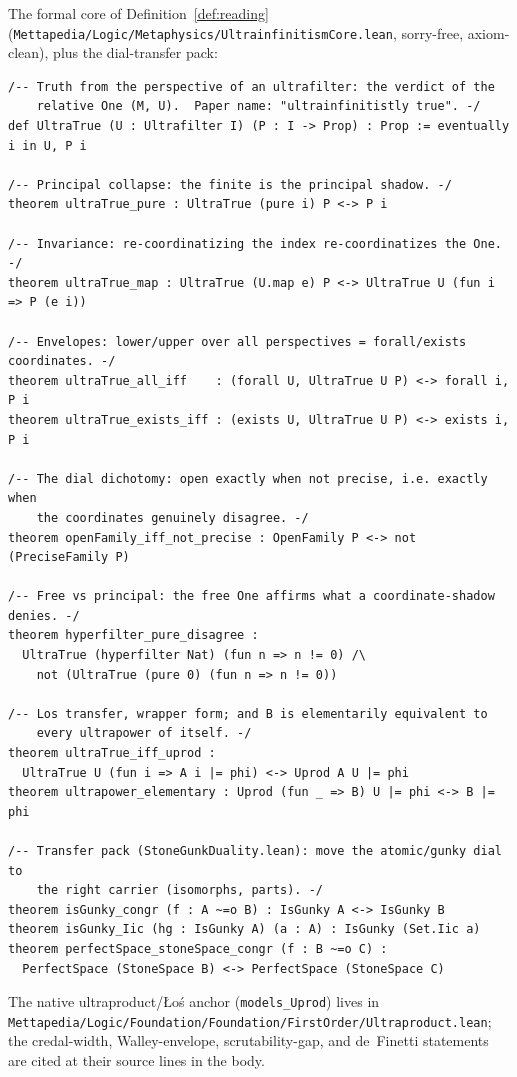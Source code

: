 \documentclass[]{article}
\theoremstyle{definition}
\theoremstyle{remark}
\newcommand{\code}[1]{\texttt{#1}}
\newcommand{\lpath}[1]{{\ttfamily\nolinkurl{#1}}}
\begin{document}
\noindent The formal core of Definition~\ref{def:reading}
(\lpath{Mettapedia/Logic/Metaphysics/UltrainfinitismCore.lean}, sorry-free,
axiom-clean), plus the dial-transfer pack:

\begin{lstlisting}
/-- Truth from the perspective of an ultrafilter: the verdict of the
    relative One (M, U).  Paper name: "ultrainfinitistly true". -/
def UltraTrue (U : Ultrafilter I) (P : I -> Prop) : Prop := eventually i in U, P i

/-- Principal collapse: the finite is the principal shadow. -/
theorem ultraTrue_pure : UltraTrue (pure i) P <-> P i

/-- Invariance: re-coordinatizing the index re-coordinatizes the One. -/
theorem ultraTrue_map : UltraTrue (U.map e) P <-> UltraTrue U (fun i => P (e i))

/-- Envelopes: lower/upper over all perspectives = forall/exists coordinates. -/
theorem ultraTrue_all_iff    : (forall U, UltraTrue U P) <-> forall i, P i
theorem ultraTrue_exists_iff : (exists U, UltraTrue U P) <-> exists i, P i

/-- The dial dichotomy: open exactly when not precise, i.e. exactly when
    the coordinates genuinely disagree. -/
theorem openFamily_iff_not_precise : OpenFamily P <-> not (PreciseFamily P)

/-- Free vs principal: the free One affirms what a coordinate-shadow denies. -/
theorem hyperfilter_pure_disagree :
  UltraTrue (hyperfilter Nat) (fun n => n != 0) /\
    not (UltraTrue (pure 0) (fun n => n != 0))

/-- Los transfer, wrapper form; and B is elementarily equivalent to
    every ultrapower of itself. -/
theorem ultraTrue_iff_uprod :
  UltraTrue U (fun i => A i |= phi) <-> Uprod A U |= phi
theorem ultrapower_elementary : Uprod (fun _ => B) U |= phi <-> B |= phi

/-- Transfer pack (StoneGunkDuality.lean): move the atomic/gunky dial to
    the right carrier (isomorphs, parts). -/
theorem isGunky_congr (f : A ~=o B) : IsGunky A <-> IsGunky B
theorem isGunky_Iic (hg : IsGunky A) (a : A) : IsGunky (Set.Iic a)
theorem perfectSpace_stoneSpace_congr (f : B ~=o C) :
  PerfectSpace (StoneSpace B) <-> PerfectSpace (StoneSpace C)
\end{lstlisting}

\noindent The native ultraproduct/{\L}o\'s anchor (\code{models\_Uprod}) lives in
\lpath{Mettapedia/Logic/Foundation/Foundation/FirstOrder/Ultraproduct.lean}; the
credal-width, Walley-envelope, scrutability-gap, and de~Finetti statements are cited at
their source lines in the body.
\end{document}
